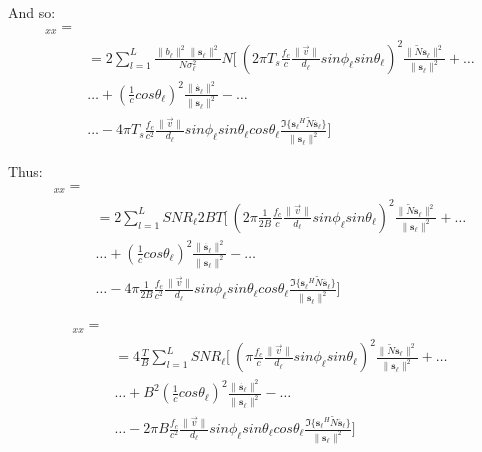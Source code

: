 \documentclass[10pt,a4paper]{report}
\begin{document}
And so:
\begin{eqnarray}
[J]_{x x} = \\
&= 2\sum_{l=1}^{L}\frac{\|b_\ell \|^2\|\mathbf{s_\ell }\|^2}{N \sigma_\ell ^2} N [\ \left(2 \pi T_s \frac{f_c}{c}\frac{\|\vec{v}\|}{d_\ell }sin\phi_\ell  sin\theta_\ell  \right)^2 \frac{\|\tilde{N}\mathbf{s_\ell }\|^2}{\|\mathbf{s_\ell }\|^2}+ \dots \nonumber \\
&\dots+ \left( \frac{1}{c} cos\theta_\ell  \right)^2 \frac{\|\mathbf{\dot{s_\ell }}\|^2}{\|\mathbf{s_\ell }\|^2} - \dots \nonumber \\
&\dots - 4 \pi T_s \frac{f_c}{c^2}\frac{\|\vec{v}\|}{d_\ell }sin\phi_\ell  sin\theta_\ell  cos \theta_\ell  \frac{\Im\{\mathbf{s_\ell }^H\tilde{N}\mathbf{\dot{s_\ell }}\}}{\|\mathbf{s_\ell }\|^2} ] \nonumber
\end{eqnarray}

Thus:
\begin{eqnarray}
[J]_{x x} = \\
&= 2\sum_{l=1}^{L}{SNR}_\ell 2BT [\ \left(2 \pi \frac{1}{2B} \frac{f_c}{c}\frac{\|\vec{v}\|}{d_\ell }sin\phi_\ell  sin\theta_\ell  \right)^2 \frac{\|\tilde{N}\mathbf{s_\ell }\|^2}{\|\mathbf{s_\ell }\|^2}+ \dots \nonumber \\
&\dots+ \left( \frac{1}{c} cos\theta_\ell  \right)^2 \frac{\|\mathbf{\dot{s_\ell }}\|^2}{\|\mathbf{s_\ell }\|^2} - \dots \nonumber \\
&\dots - 4 \pi \frac{1}{2B} \frac{f_c}{c^2}\frac{\|\vec{v}\|}{d_\ell }sin\phi_\ell  sin\theta_\ell  cos \theta_\ell  \frac{\Im\{\mathbf{s_\ell }^H\tilde{N}\mathbf{\dot{s_\ell }}\}}{\|\mathbf{s_\ell }\|^2} ] \nonumber
\end{eqnarray}

\begin{eqnarray}
[J]_{x x} = \\
&= 4\frac{T}{B} \sum_{l=1}^{L}{SNR}_\ell  [\ \left( \pi \frac{f_c}{c}\frac{\|\vec{v}\|}{d_\ell }sin\phi_\ell  sin\theta_\ell  \right)^2 \frac{\|\tilde{N}\mathbf{s_\ell }\|^2}{\|\mathbf{s_\ell }\|^2}+ \dots \nonumber \\
&\dots+ B^2\left( \frac{1}{c} cos\theta_\ell  \right)^2 \frac{\|\mathbf{\dot{s_\ell }}\|^2}{\|\mathbf{s_\ell }\|^2} - \dots \nonumber \\
&\dots - 2 \pi B \frac{f_c}{c^2}\frac{\|\vec{v}\|}{d_\ell }sin\phi_\ell  sin\theta_\ell  cos \theta_\ell  \frac{\Im\{\mathbf{s_\ell }^H\tilde{N}\mathbf{\dot{s_\ell }}\}}{\|\mathbf{s_\ell }\|^2} ] \nonumber
\end{eqnarray}
\end{document}
